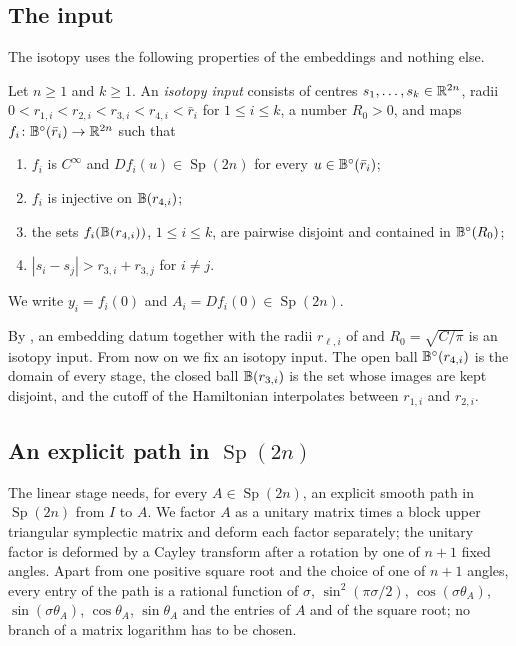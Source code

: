 \subsection{The input}\label{sec:iso-input}

The isotopy uses the following properties of the embeddings and nothing else.

\begin{definition}\label{def:iso-hyp}
Let $n\ge1$ and $k\ge1$. An \emph{isotopy input} consists of centres $s_1,\dots,s_k\in\mathbb{R}^{2n}$, radii
$0<r_{1,i}<r_{2,i}<r_{3,i}<r_{4,i}<\bar r_i$ for $1\le i\le k$, a number $R_0>0$, and maps
$f_i\colon\mathbb{B}^\circ(\bar r_i)\to\mathbb{R}^{2n}$ such that
\begin{enumerate}[label=(\roman*)]
\item $f_i$ is $C^\infty$ and $Df_i(u)\in\operatorname{Sp}(2n)$ for every $u\in\mathbb{B}^\circ(\bar r_i)$;
\item $f_i$ is injective on $\mathbb{B}(r_{4,i})$;
\item the sets $f_i(\mathbb{B}(r_{4,i}))$, $1\le i\le k$, are pairwise disjoint and contained in $\mathbb{B}^\circ(R_0)$;
\item $|s_i-s_j|>r_{3,i}+r_{3,j}$ for $i\ne j$.
\end{enumerate}
We write $y_i=f_i(0)$ and $A_i=Df_i(0)\in\operatorname{Sp}(2n)$.
\end{definition}

By , an embedding datum together with the radii $r_{\ell,i}$ of 
and $R_0=\sqrt{C/\pi}$ is an isotopy input. From now on we fix an isotopy input. The open ball $\mathbb{B}^\circ(r_{4,i})$ is the
domain of every stage, the closed ball $\mathbb{B}(r_{3,i})$ is the set whose images are kept disjoint, and the cutoff of the
Hamiltonian interpolates between $r_{1,i}$ and $r_{2,i}$.

\subsection{An explicit path in $\operatorname{Sp}(2n)$}\label{sec:iso-linear}

The linear stage needs, for every $A\in\operatorname{Sp}(2n)$, an explicit smooth path in $\operatorname{Sp}(2n)$
from $I$ to $A$. We factor $A$ as a unitary matrix times a block upper triangular symplectic matrix and deform
each factor separately; the unitary factor is deformed by a Cayley transform after a rotation by one of $n+1$ fixed
angles. Apart from one positive square root and the choice of one of $n+1$ angles, every entry of the path is a rational
function of $\sigma$, $\sin^2(\pi\sigma/2)$, $\cos(\sigma\theta_A)$, $\sin(\sigma\theta_A)$, $\cos\theta_A$, $\sin\theta_A$ and the
entries of $A$ and of the square root; no branch of a matrix logarithm has to be chosen.

